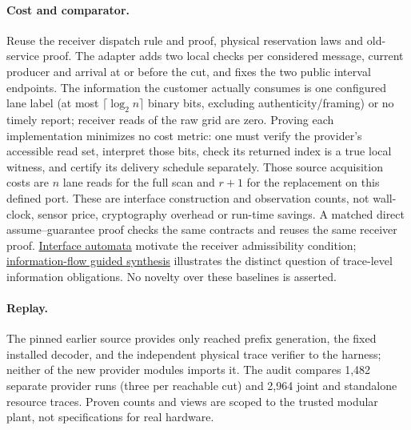 \documentclass[11pt]{article}
\begin{document}
\paragraph{Cost and comparator.}
Reuse the receiver dispatch rule and proof, physical reservation laws and old-service proof. The adapter adds two local checks per considered message, current producer and arrival at or before the cut, and fixes the two public interval endpoints. The information the customer actually consumes is one configured lane label (at most $\lceil\log_2 n\rceil$ binary bits, excluding authenticity/framing) or no timely report; receiver reads of the raw grid are zero. Proving each implementation minimizes no cost metric: one must verify the provider's accessible read set, interpret those bits, check its returned index is a true local witness, and certify its delivery schedule separately. Those source acquisition costs are $n$ lane reads for the full scan and $r+1$ for the replacement on this defined port. These are interface construction and observation counts, not wall-clock, sensor price, cryptography overhead or run-time savings. A matched direct assume--guarantee proof checks the same contracts and reuses the same receiver proof. \href{https://web.cs.wpi.edu/~heineman/html/teaching_/CS562/p109-de_alfaro.pdf}{Interface automata} motivate the receiver admissibility condition; \href{https://arxiv.org/abs/2205.12085}{information-flow guided synthesis} illustrates the distinct question of trace-level information obligations. No novelty over these baselines is asserted.

\paragraph{Replay.}
The pinned earlier source provides only reached prefix generation, the fixed installed decoder, and the independent physical trace verifier to the harness; neither of the new provider modules imports it. The audit compares 1,482 separate provider runs (three per reachable cut) and 2,964 joint and standalone resource traces. Proven counts and views are scoped to the trusted modular plant, not specifications for real hardware.
\end{document}
